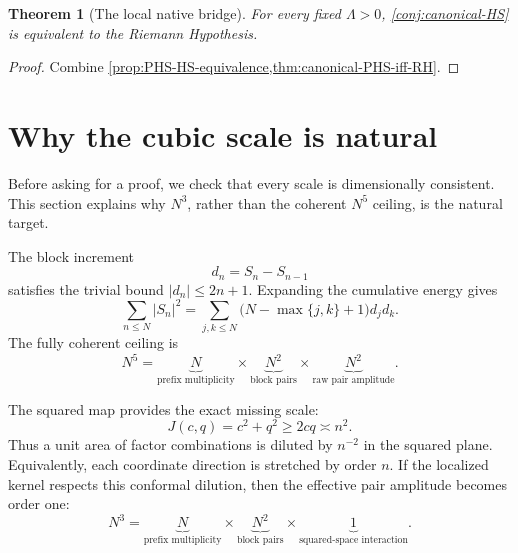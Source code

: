 \documentclass[11pt]{article}
\newtheorem{theorem}{Theorem}[section]
\theoremstyle{definition}
\newcommand{\1}{\mathbf{1}}
\begin{document}
\begin{theorem}[The local native bridge]
\label{thm:canonical-HS-iff-RH}
For every fixed $\Lambda>0$, \cref{conj:canonical-HS} is equivalent to the Riemann Hypothesis.
\end{theorem}

\begin{proof}
Combine \cref{prop:PHS-HS-equivalence,thm:canonical-PHS-iff-RH}.
\end{proof}

\section{Why the cubic scale is natural}
\label{sec:exponent-accounting}

Before asking for a proof, we check that every scale is dimensionally consistent.  This section explains why $N^3$, rather than the coherent $N^5$ ceiling, is the natural target.

The block increment
\begin{equation}
 d_n=S_n-S_{n-1}
 \label{eq:d-n}
\end{equation}
satisfies the trivial bound $|d_n|\le2n+1$.  Expanding the cumulative energy gives
\begin{equation}
 \sum_{n\le N}|S_n|^2
 =
 \sum_{j,k\le N}
 \bigl(N-\max\{j,k\}+1\bigr)d_jd_k.
 \label{eq:triangular-energy}
\end{equation}
The fully coherent ceiling is
\begin{equation}
 N^5
 =
 \underbrace{N}_{\text{prefix multiplicity}}
 \times
 \underbrace{N^2}_{\text{block pairs}}
 \times
 \underbrace{N^2}_{\text{raw pair amplitude}}.
 \label{eq:N5-accounting}
\end{equation}

The squared map provides the exact missing scale:
\begin{equation}
 J(c,q)=c^2+q^2\ge2cq\asymp n^2.
 \label{eq:two-power-J}
\end{equation}
Thus a unit area of factor combinations is diluted by $n^{-2}$ in the squared plane.  Equivalently, each coordinate direction is stretched by order $n$.  If the localized kernel respects this conformal dilution, then the effective pair amplitude becomes order one:
\begin{equation}
 N^3
 =
 \underbrace{N}_{\text{prefix multiplicity}}
 \times
 \underbrace{N^2}_{\text{block pairs}}
 \times
 \underbrace{1}_{\text{squared-space interaction}}.
 \label{eq:N3-accounting}
\end{equation}
\end{document}
